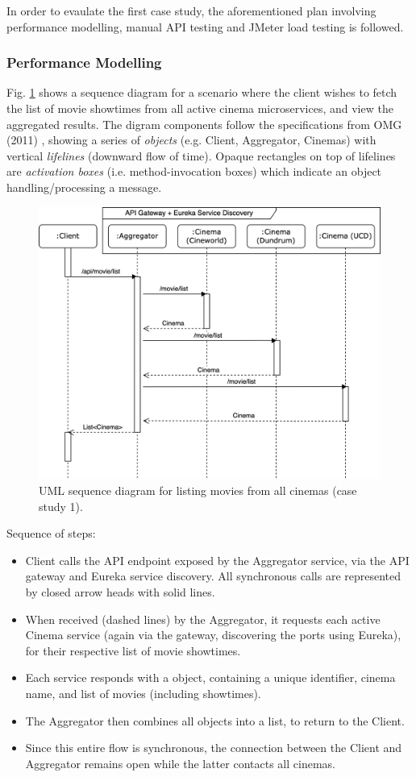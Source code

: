 In order to evaulate the first case study, the aforementioned plan involving performance modelling, manual API testing and JMeter load testing is followed.

\subsubsection{Performance Modelling}

Fig. \ref{fig:cs01-sequence} shows a sequence diagram for a scenario where the client wishes to fetch the list of movie showtimes from all active cinema microservices, and view the aggregated results. The digram components follow the specifications from OMG (2011) \cite{omg11}, showing a series of \textit{objects} (e.g. Client, Aggregator, Cinemas) with vertical \textit{lifelines} (downward flow of time). Opaque rectangles on top of lifelines are \textit{activation boxes} (i.e. method-invocation boxes) which indicate an object handling/processing a message.

\begin{figure}[H]
	\centering
	\includegraphics[width=0.75\linewidth]{./assets/diagrams/cs01-sequence.png}
	\caption{UML sequence diagram for listing movies from all cinemas (case study 1).}
	\label{fig:cs01-sequence}
\end{figure}

Sequence of steps:
\begin{itemize}
	\item Client calls the API endpoint  exposed by the Aggregator service, via the API gateway and Eureka service discovery. All synchronous calls are represented by closed arrow heads with solid lines.
	\item When received (dashed lines) by the Aggregator, it requests each active Cinema service (again via the gateway, discovering the ports using Eureka), for their respective list of movie showtimes.
	\item Each service responds with a  object, containing a unique identifier, cinema name, and list of movies (including showtimes).
	\item The Aggregator then combines all  objects into a list, to return to the Client.
	\item Since this entire flow is synchronous, the connection between the Client and Aggregator remains open while the latter contacts all cinemas.
\end{itemize}

